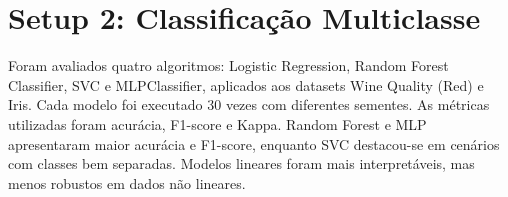 \section{Setup 2: Classificação Multiclasse}
Foram avaliados quatro algoritmos: Logistic Regression, Random Forest Classifier, SVC e MLPClassifier, aplicados aos datasets Wine Quality (Red) e Iris. Cada modelo foi executado 30 vezes com diferentes sementes. As métricas utilizadas foram acurácia, F1-score e Kappa. Random Forest e MLP apresentaram maior acurácia e F1-score, enquanto SVC destacou-se em cenários com classes bem separadas. Modelos lineares foram mais interpretáveis, mas menos robustos em dados não lineares.
